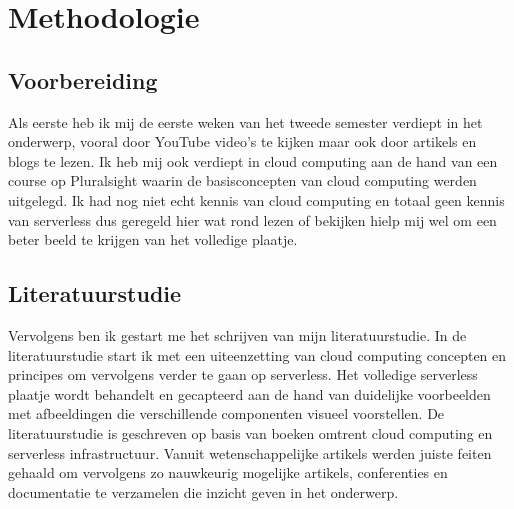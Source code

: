 
\chapter{Methodologie}
\label{ch:methodologie}


\section{Voorbereiding}
Als eerste heb ik mij de eerste weken van het tweede semester verdiept in het onderwerp, vooral door YouTube video's te kijken maar ook door artikels en blogs te lezen. Ik heb mij ook  verdiept in cloud computing aan de hand van een course op Pluralsight waarin de basisconcepten van cloud computing werden uitgelegd. Ik had nog niet echt kennis van cloud computing en totaal geen kennis van serverless dus geregeld hier wat rond lezen of bekijken hielp mij wel om een beter beeld te krijgen van het volledige plaatje. 

\section{Literatuurstudie}
Vervolgens ben ik gestart me het schrijven van mijn literatuurstudie. In de literatuurstudie start ik met een uiteenzetting van cloud computing concepten en principes om vervolgens verder te gaan op serverless. Het volledige serverless plaatje wordt behandelt en gecapteerd aan de hand van duidelijke voorbeelden met afbeeldingen die verschillende componenten visueel voorstellen. De literatuurstudie is geschreven op basis van boeken omtrent cloud computing en serverless infrastructuur. Vanuit wetenschappelijke artikels werden juiste feiten gehaald om vervolgens zo nauwkeurig mogelijke artikels, conferenties en documentatie te verzamelen die inzicht geven in het onderwerp.

